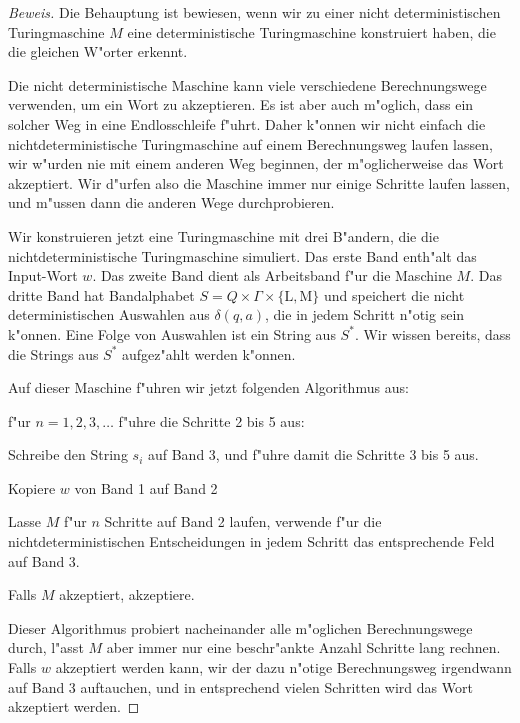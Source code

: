 \begin{proof}[Beweis]
Die Behauptung ist bewiesen, wenn wir zu einer nicht deterministischen
Turingmaschine $M$ eine deterministische Turingmaschine konstruiert haben,
die die gleichen W"orter erkennt. 

Die nicht deterministische Maschine kann viele verschiedene Berechnungswege
verwenden, um ein Wort zu akzeptieren.
Es ist aber auch m"oglich, dass ein solcher Weg in eine Endlosschleife f"uhrt. 
Daher k"onnen wir nicht einfach die nichtdeterministische Turingmaschine
auf einem Berechnungsweg laufen lassen, wir w"urden nie mit einem 
anderen Weg beginnen, der m"oglicherweise das Wort akzeptiert.
Wir d"urfen also die Maschine immer nur einige Schritte laufen lassen,
und m"ussen dann die anderen Wege durchprobieren.

Wir konstruieren jetzt eine Turingmaschine mit drei B"andern, die die
nichtdeterministische Turingmaschine simuliert. Das erste Band 
enth"alt das Input-Wort $w$.
Das zweite Band dient als Arbeitsband f"ur die Maschine $M$. Das
dritte Band hat Bandalphabet $S=Q\times \Gamma\times\{\text{L},\text{M}\}$
und speichert die nicht deterministischen Auswahlen aus $\delta(q,a)$,
die  in jedem Schritt n"otig sein k"onnen. Eine Folge von Auswahlen
ist ein String aus $S^*$. Wir wissen bereits, dass die Strings aus $S^*$
aufgez"ahlt werden k"onnen.

Auf dieser Maschine f"uhren
wir jetzt folgenden Algorithmus aus:

\begin{compactenum}
\item f"ur $n=1,2,3,\dots$ f"uhre die Schritte 2 bis 5 aus:
\item Schreibe den String $s_i$  auf Band 3, 
und f"uhre damit die Schritte 3 bis 5 aus.
\item Kopiere $w$ von Band 1 auf Band 2
\item Lasse $M$ f"ur $n$ Schritte auf Band 2 laufen, verwende f"ur die
nichtdeterministischen Entscheidungen in jedem Schritt das entsprechende
Feld auf Band 3.
\item Falls $M$ akzeptiert, akzeptiere.
\end{compactenum}
Dieser Algorithmus probiert nacheinander alle m"oglichen Berechnungswege
durch, l"asst $M$ aber immer nur eine beschr"ankte Anzahl Schritte lang
rechnen. Falls $w$ akzeptiert werden kann, wir der dazu n"otige Berechnungsweg
irgendwann auf Band 3 auftauchen, und in entsprechend vielen Schritten wird
das Wort akzeptiert werden.
\end{proof}

